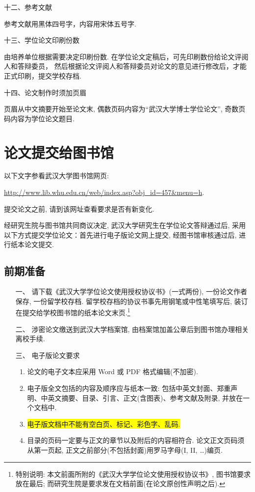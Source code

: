 \documentclass{WHUPhd}  %
\begin{document}
{\heiti 十二、参考文献}

参考文献用黑体四号字，内容用宋体五号字.

{\heiti 十三、学位论文印刷份数}

由培养单位根据需要决定印刷份数. 在学位论文定稿后，可先印刷数份给论文评阅人和答辩委员，
然后根据论文评阅人和答辩委员对论文的意见进行修改后，才能正式印刷，提交学校存档.

{\heiti 十四、论文制作时须加页眉}


页眉从中文摘要开始至论文末, 偶数页码内容为``武汉大学博士学位论文'', 奇数页码内容为学位论文题目.


\chapter{论文提交给图书馆}

{\kaishu 以下文字参看武汉大学图书馆网页:
 \begin{center}
 \url{http://www.lib.whu.edu.cn/web/index.asp?obj_id=457&menu=h}.
 \end{center}
 提交论文之前, 请到该网址查看要求是否有新变化.
}

    经研究生院与图书馆共同商议决定, 武汉大学研究生在学位论文答辩通过后,
    采用以下方式提交学位论文：首先进行电子版论文网上提交, 经图书馆审核通过后, 进行纸本论文提交.

\section*{前期准备}
\begin{itemize}
  \item[一、] 请下载《武汉大学学位论文使用授权协议书》(一式两份), 一份论文作者保存, 一份留学校存档.
    留学校存档的协议书事先用钢笔或中性笔填写后,  装订在提交给学校图书馆的纸本论文末页.\footnote{\heiti 特别说明:
    本文前面所附的《武汉大学学位论文使用授权协议书》, 图书馆要求放在最后;
    而研究生院是要求发在文档前面(在论文原创性声明之后). }

    \item[二、]涉密论文缴送到武汉大学档案馆, 由档案馆加盖公章后到图书馆办理相关离校手续.

    \item[三、]电子版论文要求
\begin{enumerate}[1.]
  \item 论文的电子文本应采用 Word 或 PDF 格式编辑(不加密).
  \item 电子版全文包括的内容及顺序应与纸本一致: 包括中英文封面、郑重声明、中英文摘要、目录、引言、正文(含图表)、参考文献及附录, 并放在一个文档中.
  \item \colorbox{yellow}{电子版文档中不能有空白页、标记、彩色字、乱码.}
  \item 目录的页码一定要与正文的章节以及附后的内容相符合. 论文正文页码须从第一页起, 正文之前部分(不包括封面)用罗马字母(I, II, \dots)编页.
\end{enumerate}
\end{itemize}
\end{document}
